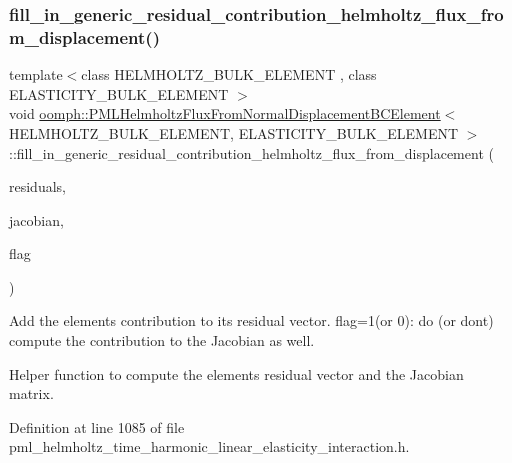 \subsubsection{\texorpdfstring{fill\+\_\+in\+\_\+generic\+\_\+residual\+\_\+contribution\+\_\+helmholtz\+\_\+flux\+\_\+from\+\_\+displacement()}{fill\_in\_generic\_residual\_contribution\_helmholtz\_flux\_from\_displacement()}}
{\footnotesize\ttfamily template$<$class H\+E\+L\+M\+H\+O\+L\+T\+Z\+\_\+\+B\+U\+L\+K\+\_\+\+E\+L\+E\+M\+E\+NT , class E\+L\+A\+S\+T\+I\+C\+I\+T\+Y\+\_\+\+B\+U\+L\+K\+\_\+\+E\+L\+E\+M\+E\+NT $>$ \\
void \hyperlink{classoomph_1_1PMLHelmholtzFluxFromNormalDisplacementBCElement}{oomph\+::\+P\+M\+L\+Helmholtz\+Flux\+From\+Normal\+Displacement\+B\+C\+Element}$<$ H\+E\+L\+M\+H\+O\+L\+T\+Z\+\_\+\+B\+U\+L\+K\+\_\+\+E\+L\+E\+M\+E\+NT, E\+L\+A\+S\+T\+I\+C\+I\+T\+Y\+\_\+\+B\+U\+L\+K\+\_\+\+E\+L\+E\+M\+E\+NT $>$\+::fill\+\_\+in\+\_\+generic\+\_\+residual\+\_\+contribution\+\_\+helmholtz\+\_\+flux\+\_\+from\+\_\+displacement (\begin{DoxyParamCaption}\item[{\hyperlink{classoomph_1_1Vector}{Vector}$<$ double $>$ \&}]{residuals,  }\item[{\hyperlink{classoomph_1_1DenseMatrix}{Dense\+Matrix}$<$ double $>$ \&}]{jacobian,  }\item[{const unsigned \&}]{flag }\end{DoxyParamCaption})\hspace{0.3cm}{\ttfamily [private]}}



Add the element\textquotesingle{}s contribution to its residual vector. flag=1(or 0)\+: do (or don\textquotesingle{}t) compute the contribution to the Jacobian as well. 

Helper function to compute the element\textquotesingle{}s residual vector and the Jacobian matrix. 

Definition at line 1085 of file pml\+\_\+helmholtz\+\_\+time\+\_\+harmonic\+\_\+linear\+\_\+elasticity\+\_\+interaction.\+h.



